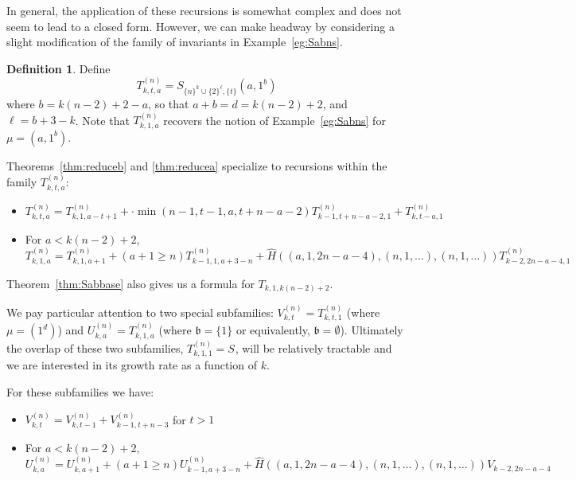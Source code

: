 \documentclass[11pt]{article}           %
\renewcommand{\b}{\mathfrak b}
\theoremstyle{definition}
\newtheorem{dfn}{Definition}[section]
\begin{document}
In general, the application of these recursions is somewhat complex and
does not seem to lead to a closed form. However, we can make headway
by considering a slight modification of the family of invariants
in Example~\ref{eg:Sabns}.

\begin{dfn}
  Define
  \[
  T_{k,t,a}^{(n)}=S_{\{n\}^k\cup\{2\}^{\ell},\{t\}}(a,1^b)
  \]
  where $b=k(n-2)+2-a$, so that $a+b=d=k(n-2)+2$,
  and $\ell=b+3-k$. Note that $T_{k,1,a}^{(n)}$
  recovers the notion of Example~\ref{eg:Sabns} for $\mu=(a,1^b)$.
  \end{dfn}

Theorems~\ref{thm:reduceb} and \ref{thm:reducea} specialize to recursions
within the family $T_{k,t,a}^{(n)}$:
\begin{itemize}
\item $T_{k,t,a}^{(n)}=T_{k,1,a-t+1}^{(n)}+\cdot\min(n-1,t-1,a,t+n-a-2)T_{k-1,t+n-a-2,1}^{(n)}+ T_{k,t-a,1}^{(n)}$
  \item For $a<k(n-2)+2$, \[T_{k,1,a}^{(n)}=T_{k,1,a+1}^{(n)}+(a+1\geq n)T_{k-1,1,a+3-n}^{(n)}+\hat H((a,1,2n-a-4),(n,1,\dots),(n,1,\dots))T_{k-2,2n-a-4,1}^{(n)}\]
\end{itemize}
Theorem~\ref{thm:Sabbase} also gives us a formula for
$T_{k,1,k(n-2)+2}$.

We pay particular attention to two special subfamilies:
$V_{k,t}^{(n)}=T_{k,t,1}^{(n)}$ (where $\mu=(1^d)$) and $U_{k,a}^{(n)}=T_{k,1,a}^{(n)}$
(where $\b=\{1\}$ or equivalently, $\b=\emptyset$). Ultimately the
overlap of these two subfamilies, $T_{k,1,1}^{(n)}=S_{}$, will be relatively tractable
and we are interested in its growth rate as a function of $k$.

For these subfamilies we have:
\begin{itemize}
\item $V_{k,t}^{(n)}=V_{k,t-1}^{(n)}+V_{k-1,t+n-3}^{(n)}$ for $t>1$
  \item For $a<k(n-2)+2$, \[U_{k,a}^{(n)}=U_{k,a+1}^{(n)}+(a+1\geq n)U_{k-1,a+3-n}^{(n)}+\hat H((a,1,2n-a-4),(n,1,\dots),(n,1,\dots)) V_{k-2,2n-a-4}\]
\end{itemize}



\iffalse
We find that:
\[
T_3(\mu,a,1)=T_3(\mu,a+1)+T_3(\mu,a)\text{ for $a>1$}
\]
\[
T_3(\mu,a,2)=T_3(\mu,a+2)+2T_3(\mu,a+1)\text{ for $a\geq 2$}
\]
\[
T_3(\mu,3,3)=T_3(\mu,6)+2T_3(\mu,5)
\]
and $T_3(\mu,a,b)=0$ if $a+b>6$ (for dimension reasons; TODO how does this fit with the last claim?).\fi
\end{document}
